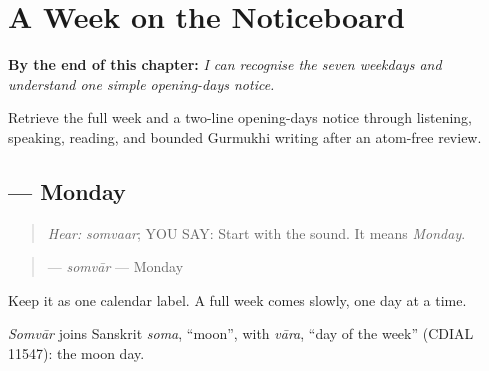 
\chapter{A Week on the Noticeboard}
\label{ch:pa-a2-weekday-schedule}

\begin{chapteropening}
\textbf{By the end of this chapter:} \emph{I can recognise the seven weekdays and understand one simple opening-days notice.}

Retrieve the full week and a two-line opening-days notice through listening, speaking, reading, and bounded Gurmukhi writing after an atom-free review.
\end{chapteropening}

\section[\texorpdfstring{\pa{ਸੋਮਵਾਰ} (somvaar)}{ਸੋਮਵਾਰ (somvaar)}]{ — Monday}

\label{lesson:PA-C182-somvar}



\begin{quote}
\emph{Hear:} \emph{somvaar}; YOU SAY: \textbf{} Start with the sound. It means \emph{Monday}.
\end{quote}

\begin{grammarlens}[title={Grammar Lens: one weekday}]
\begin{quote}
\textbf{} — \emph{somvār} — Monday
\end{quote}

Keep it as one calendar label. A full week comes slowly, one day at a time.
\end{grammarlens}

\begin{cousinweb}
\emph{Somvār} joins Sanskrit \emph{soma}, \textquotedblleft{}moon\textquotedblright{}, with \emph{vāra}, \textquotedblleft{}day of the week\textquotedblright{} (CDIAL 11547): the moon day.
\end{cousinweb}

